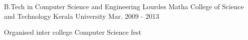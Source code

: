 

\begin{cventries}

  \cventry
    {B.Tech in Computer Science and Engineering } %
    {Lourdes Matha College of Science and Technology} %
    {Kerala University} %
    {Mar. 2009 - 2013} %
    {
      \begin{cvitems} %
        \item {Organised inter college Computer Science fest}
      \end{cvitems}
    }

\end{cventries}

